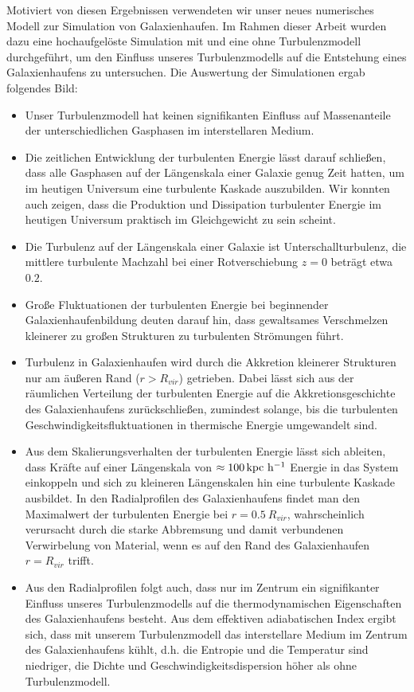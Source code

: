 Motiviert von diesen Ergebnissen verwendeten wir unser neues numerisches
Modell zur Simulation von Galaxienhaufen. Im Rahmen dieser Arbeit wurden dazu
eine hochaufgelöste Simulation mit und eine ohne Turbulenzmodell
durchgeführt, um den Einfluss unseres Turbulenzmodells auf die Entstehung eines
Galaxienhaufens zu untersuchen. Die Auswertung der Simulationen ergab folgendes
Bild:
\begin{itemize}
\item Unser Turbulenzmodell hat keinen signifikanten Einfluss auf Massenanteile
der unterschiedlichen Gasphasen im interstellaren Medium.
\item Die zeitlichen Entwicklung der turbulenten Energie lässt darauf 
schließen, dass alle Gasphasen  auf der Längenskala einer Galaxie genug Zeit
hatten, um im heutigen Universum eine turbulente Kaskade auszubilden. Wir
konnten auch zeigen, dass die Produktion und Dissipation turbulenter Energie 
im heutigen Universum praktisch im Gleichgewicht zu sein scheint.
\item Die Turbulenz auf der Längenskala einer Galaxie ist Unterschallturbulenz,
die mittlere turbulente Machzahl bei einer Rotverschiebung $z=0$ beträgt etwa
$0.2$.
\item Große Fluktuationen der turbulenten Energie bei beginnender
Galaxienhaufenbildung deuten darauf hin, dass \glqq gewaltsames\grqq
Verschmelzen
kleinerer zu großen Strukturen zu turbulenten Strömungen führt.
\item Turbulenz in Galaxienhaufen wird durch die Akkretion kleinerer
Strukturen nur am äußeren Rand ($r>R_{vir}$) getrieben. Dabei
lässt sich aus der räumlichen Verteilung der turbulenten Energie auf die
Akkretionsgeschichte des Galaxienhaufens zurückschließen, zumindest solange,
bis die turbulenten Geschwindigkeitsfluktuationen in thermische Energie
umgewandelt sind.
\item Aus dem Skalierungsverhalten der turbulenten Energie lässt sich ableiten,
dass Kräfte auf einer Längenskala von  $\approx \unit[100]{kpc\ h^{-1}}$
Energie in das System einkoppeln und sich zu kleineren Längenskalen hin eine
turbulente Kaskade ausbildet. In den Radialprofilen des Galaxienhaufens findet
man den Maximalwert der turbulenten Energie bei $r=0.5\ R_{vir}$,
wahrscheinlich verursacht durch die starke Abbremsung und damit verbundenen
Verwirbelung von Material, wenn es auf den Rand des Galaxienhaufen 
$r=R_{vir}$ trifft.  
\item Aus den Radialprofilen folgt auch, dass nur im Zentrum ein
signifikanter Einfluss unseres Turbulenzmodells auf die thermodynamischen
Eigenschaften des Galaxienhaufens besteht. Aus dem effektiven adiabatischen
Index ergibt sich, dass mit unserem Turbulenzmodell das interstellare Medium im
Zentrum des Galaxienhaufens kühlt, d.h. die Entropie und die Temperatur sind
niedriger, die Dichte und Geschwindigkeitsdispersion höher als ohne
Turbulenzmodell.
\end{itemize}

